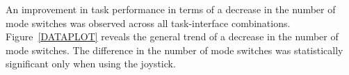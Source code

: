 \documentclass[conference]{IEEEtran}
\begin{document}
%
% 
% 

An improvement in task performance in terms of a decrease in the number of mode switches was observed across all task-interface combinations. 
Figure~\ref{DATAPLOT} reveals the general trend of a decrease in the number of mode switches. The difference in the number of mode switches was statistically significant only when using the joystick.
\end{document}
